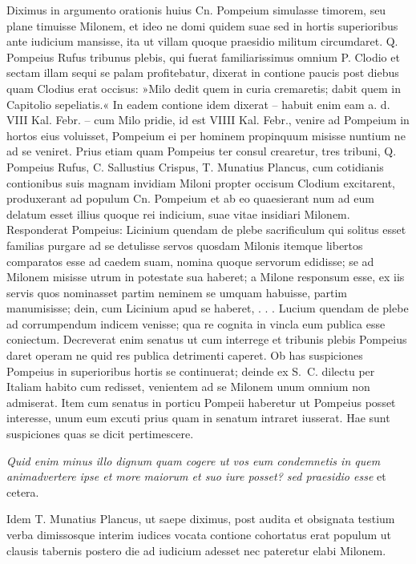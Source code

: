 Diximus in argumento orationis huius Cn. Pompeium simulasse timorem, seu plane timuisse Milonem, et ideo ne domi quidem suae sed in hortis superioribus ante iudicium mansisse, ita ut villam quoque praesidio militum circumdaret. Q. Pompeius Rufus tribunus plebis, qui fuerat familiarissimus omnium P. Clodio et sectam illam sequi se palam profitebatur, dixerat in contione paucis post diebus quam Clodius erat occisus: »Milo dedit quem in curia cremaretis; dabit quem in Capitolio sepeliatis.« In eadem contione idem dixerat – habuit enim eam a. d. VIII Kal. Febr. – cum Milo pridie, id est VIIII Kal. Febr., venire ad Pompeium in hortos eius voluisset, Pompeium ei per hominem propinquum misisse nuntium ne ad se veniret. Prius etiam quam Pompeius ter consul crearetur, tres tribuni, Q. Pompeius Rufus, C. Sallustius Crispus, T. Munatius Plancus, cum cotidianis contionibus suis magnam invidiam Miloni propter occisum Clodium excitarent, produxerant ad populum Cn. Pompeium et ab eo quaesierant num ad eum delatum esset illius quoque rei indicium, suae vitae insidiari Milonem. Responderat Pompeius: Licinium quendam de plebe sacrificulum qui solitus esset familias purgare ad se detulisse servos quosdam Milonis itemque libertos comparatos esse ad caedem suam, nomina quoque servorum edidisse; se ad Milonem misisse utrum in potestate sua haberet; a Milone responsum esse, ex iis servis quos nominasset partim neminem se umquam habuisse, partim manumisisse; dein, cum Licinium apud se haberet, . . . Lucium quendam de plebe ad corrumpendum indicem venisse; qua re cognita in vincla eum publica esse coniectum. Decreverat enim senatus ut cum interrege et tribunis plebis Pompeius daret operam ne quid res publica detrimenti caperet. Ob has suspiciones Pompeius in superioribus hortis se continuerat; deinde ex S.~C. dilectu per Italiam habito cum redisset, venientem ad se Milonem unum omnium non admiserat. Item cum senatus in porticu Pompeii haberetur ut Pompeius posset interesse, unum eum excuti prius quam in senatum intraret iusserat. Hae sunt suspiciones quas se dicit pertimescere.

\textit{Quid enim minus illo dignum quam cogere ut vos eum condemnetis in quem animadvertere ipse et more maiorum et suo iure posset? sed praesidio esse} et cetera.

Idem T. Munatius Plancus, ut saepe diximus, post audita et obsignata testium verba dimissosque interim iudices vocata contione cohortatus erat populum ut clausis tabernis postero die ad iudicium adesset nec pateretur elabi Milonem.

